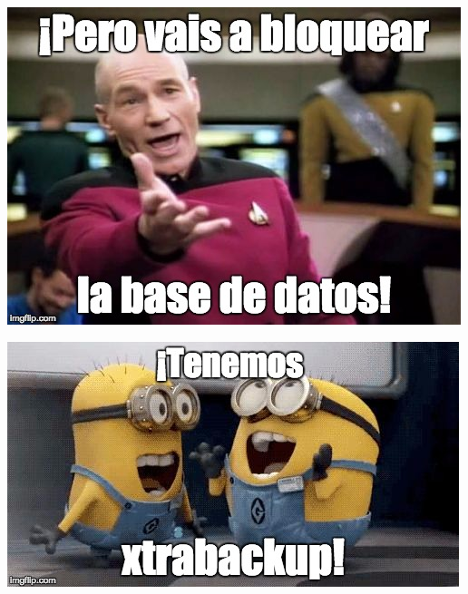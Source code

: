 \documentclass[UTF8]{beamer}
\begin{document}
\begin{frame}
	\includegraphics[width=\textwidth,height=\textheight,keepaspectratio]{bloquear}
\end{frame}

\begin{frame}
	\includegraphics[width=\textwidth,height=\textheight,keepaspectratio]{tenemos_xtrabackup}	
	
\end{frame}
	
	
	
	
	
	
\end{document}
